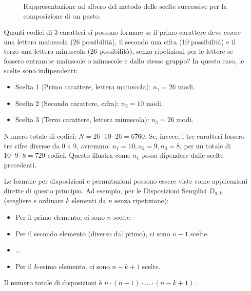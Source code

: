 \begin{example}
\begin{figure}[h!]
    \caption{Rappresentazione ad albero del metodo delle scelte successive per la composizione di un pasto.}
    \label{fig:albero_scelte}
\end{figure}
\end{example}

\begin{example}
Quanti codici di 3 caratteri si possono formare se il primo carattere deve essere una lettera maiuscola (26 possibilità), il secondo una cifra (10 possibilità) e il terzo una lettera minuscola (26 possibilità), senza ripetizioni per le lettere se fossero entrambe maiuscole o minuscole e dallo stesso gruppo? In questo caso, le scelte sono indipendenti:
\begin{itemize}
    \item Scelta 1 (Primo carattere, lettera maiuscola): $n_1 = 26$ modi.
    \item Scelta 2 (Secondo carattere, cifra): $n_2 = 10$ modi.
    \item Scelta 3 (Terzo carattere, lettera minuscola): $n_3 = 26$ modi.
\end{itemize}
Numero totale di codici: $N = 26 \cdot 10 \cdot 26 = 6760$.
Se, invece, i tre caratteri fossero tre cifre diverse da 0 a 9, avremmo: $n_1=10, n_2=9, n_3=8$, per un totale di $10 \cdot 9 \cdot 8 = 720$ codici. Questo illustra come $n_i$ possa dipendere dalle scelte precedenti.
\end{example}

Le formule per disposizioni e permutazioni possono essere viste come applicazioni dirette di questo principio. Ad esempio, per le Disposizioni Semplici $D_{n,k}$ (scegliere e ordinare $k$ elementi da $n$ senza ripetizione):
\begin{itemize}
    \item Per il primo elemento, ci sono $n$ scelte.
    \item Per il secondo elemento (diverso dal primo), ci sono $n-1$ scelte.
    \item ...
    \item Per il $k$-esimo elemento, ci sono $n-k+1$ scelte.
\end{itemize}
Il numero totale di disposizioni è $n \cdot (n-1) \cdot \dots \cdot (n-k+1)$.

